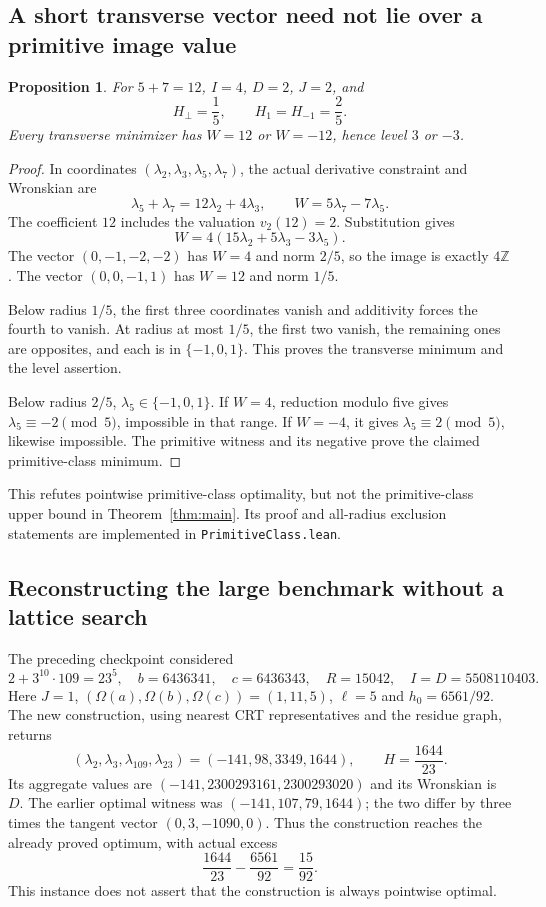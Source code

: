 \documentclass[11pt]{article}
\newtheorem{proposition}[theorem]{Proposition}
\theoremstyle{definition}
\theoremstyle{remark}
\newcommand{\Z}{\mathbb Z}
\newcommand{\Om}{\Omega}
\begin{document}
\subsection{A short transverse vector need not lie over a primitive image value}
\begin{proposition}\label{prop:five}
For $5+7=12$, $I=4$, $D=2$, $J=2$, and
\[
 H_\perp=\frac15,\qquad H_1=H_{-1}=\frac25.
\]
Every transverse minimizer has $W=12$ or $W=-12$, hence level $3$ or $-3$.
\end{proposition}
\begin{proof}
In coordinates $(\lambda_2,\lambda_3,\lambda_5,\lambda_7)$, the actual derivative constraint and Wronskian are
\[
 \lambda_5+\lambda_7=12\lambda_2+4\lambda_3,
 \qquad W=5\lambda_7-7\lambda_5.
\]
The coefficient $12$ includes the valuation $v_2(12)=2$. Substitution gives
\[
 W=4(15\lambda_2+5\lambda_3-3\lambda_5).
\]
The vector $(0,-1,-2,-2)$ has $W=4$ and norm $2/5$, so the image is exactly $4\Z$. The vector $(0,0,-1,1)$ has $W=12$ and norm $1/5$.

Below radius $1/5$, the first three coordinates vanish and additivity forces the fourth to vanish. At radius at most $1/5$, the first two vanish, the remaining ones are opposites, and each is in $\{-1,0,1\}$. This proves the transverse minimum and the level assertion.

Below radius $2/5$, $\lambda_5\in\{-1,0,1\}$. If $W=4$, reduction modulo five gives $\lambda_5\equiv-2\pmod5$, impossible in that range. If $W=-4$, it gives $\lambda_5\equiv2\pmod5$, likewise impossible. The primitive witness and its negative prove the claimed primitive-class minimum.
\end{proof}
This refutes pointwise primitive-class optimality, but not the primitive-class upper bound in Theorem~\ref{thm:main}. Its proof and all-radius exclusion statements are implemented in \texttt{PrimitiveClass.lean}.

\subsection{Reconstructing the large benchmark without a lattice search}
The preceding checkpoint considered
\[
 2+3^{10}\cdot109=23^5,
 \quad b=6436341,\quad c=6436343,
 \quad R=15042,\quad I=D=5508110403.
\]
Here $J=1$, $(\Om(a),\Om(b),\Om(c))=(1,11,5)$, $\ell=5$ and $h_0=6561/92$. The new construction, using nearest CRT representatives and the residue graph, returns
\begin{equation}\label{eq:newwitness}
 (\lambda_2,\lambda_3,\lambda_{109},\lambda_{23})
 =(-141,98,3349,1644),
 \qquad H=\frac{1644}{23}.
\end{equation}
Its aggregate values are $(-141,2300293161,2300293020)$ and its Wronskian is $D$. The earlier optimal witness was $(-141,107,79,1644)$; the two differ by three times the tangent vector $(0,3,-1090,0)$. Thus the construction reaches the already proved optimum, with actual excess
\[
 \frac{1644}{23}-\frac{6561}{92}=\frac{15}{92}.
\]
This instance does not assert that the construction is always pointwise optimal.
\end{document}
